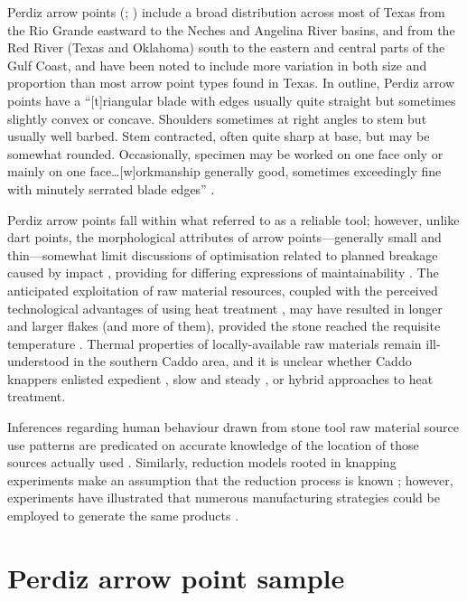 \documentclass[review]{elsarticle}
\begin{document}
Perdiz arrow points (\citealp[283 and Plate 142]{RN7795}; \citealp[504 and Plate 131]{RN5769}) include a broad distribution across most of Texas from the Rio Grande eastward to the Neches and Angelina River basins, and from the Red River (Texas and Oklahoma) south to the eastern and central parts of the Gulf Coast, and have been noted to include more variation in both size and proportion than most arrow point types found in Texas. In outline, Perdiz arrow points have a “[t]riangular blade with edges usually quite straight but sometimes slightly convex or concave. Shoulders sometimes at right angles to stem but usually well barbed. Stem contracted, often quite sharp at base, but may be somewhat rounded. Occasionally, specimen may be worked on one face only or mainly on one face…[w]orkmanship generally good, sometimes exceedingly fine with minutely serrated blade edges” \cite[504]{RN5769}. 

Perdiz arrow points fall within what \citet[738-741]{RN5873} referred to as a reliable tool; however, unlike dart points, the morphological attributes of arrow points---generally small and thin---somewhat limit discussions of optimisation related to planned breakage caused by impact \citep{RN6170,RN7045}, providing for differing expressions of maintainability \citep{RN5789}. The anticipated exploitation of raw material resources, coupled with the perceived technological advantages of using heat treatment \citep{RN6171}, may have resulted in longer and larger flakes (and more of them), provided the stone reached the requisite temperature \citep{RN5900}. Thermal properties of locally-available raw materials remain ill-understood in the southern Caddo area, and it is unclear whether Caddo knappers enlisted expedient \citep{RN8970,RN6201}, slow and steady \citep{RN8971}, or hybrid approaches to heat treatment.

Inferences regarding human behaviour drawn from stone tool raw material source use patterns are predicated on accurate knowledge of the location of those sources actually used \citep[365]{RN5787}. Similarly, reduction models rooted in knapping experiments make an assumption that the reduction process is known \citep{RN6855}; however, experiments have illustrated that numerous manufacturing strategies could be employed to generate the same products \citep{RN8968,RN8969}. 

\section*{Perdiz arrow point sample}
\end{document}
